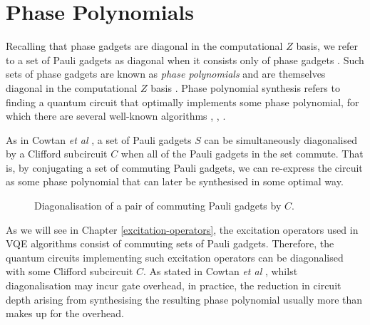 \section{Phase Polynomials}%
\label{phase-polynomials}

Recalling that phase gadgets are diagonal in the computational $Z$ basis, we refer to a set of Pauli gadgets as diagonal when it consists only of phase gadgets \cite{Cowtan2020}. Such sets of phase gadgets are known as \textit{phase polynomials} and are themselves diagonal in the computational $Z$ basis \cite{Cowtan2019}. Phase polynomial synthesis refers to finding a quantum circuit that optimally implements some phase polynomial, for which there are several well-known algorithms \cite{Amy2013}, \cite{Amy2014}, \cite{Nam2018}.

As in Cowtan \textit{et al} \cite{Cowtan2020}, a set of Pauli gadgets $S$ can be simultaneously diagonalised by a Clifford subcircuit $C$ when all of the Pauli gadgets in the set commute. That is, by conjugating a set of commuting Pauli gadgets, we can re-express the circuit as some phase polynomial that can later be synthesised in some optimal way.

\begin{figure}[H]
    \centering
    \caption{Diagonalisation of a pair of commuting Pauli gadgets by $C$.}
\end{figure}

As we will see in Chapter \ref{excitation-operators}, the excitation operators used in VQE algorithms consist of commuting sets of Pauli gadgets. Therefore, the quantum circuits implementing such excitation operators can be diagonalised with some Clifford subcircuit $C$. As stated in Cowtan \textit{et al} \cite{Cowtan2020}, whilst diagonalisation may incur gate overhead, in practice, the reduction in circuit depth arising from synthesising the resulting phase polynomial usually more than makes up for the overhead.
